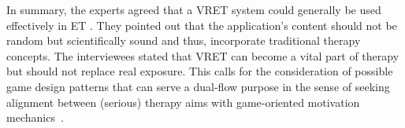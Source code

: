 In summary, the experts agreed that a \ac{VRET} system could generally be used effectively in \ac{ET}%
. They pointed out that the application’s content should not be random but scientifically sound and thus, incorporate traditional therapy concepts. The interviewees stated that \ac{VRET} can become a vital part of therapy but should not replace real exposure. This calls for the consideration of possible game design patterns that can serve a dual-flow purpose in the sense of seeking alignment between (serious) therapy aims with game-oriented motivation mechanics~\cite{smeddinck2016}.

